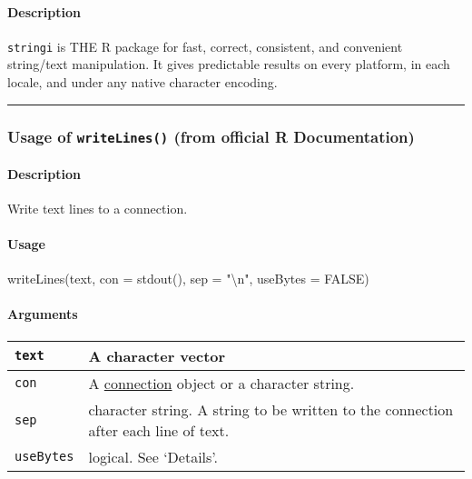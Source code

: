 \documentclass[
]{article}
\newenvironment{Shaded}{}{}
\newcommand{\NormalTok}[1]{#1}
\begin{document}
\hypertarget{description}{%
\paragraph{\texorpdfstring{\textbf{Description}}{Description}}\label{description}}

\texttt{stringi} is THE R package for fast, correct, consistent, and
convenient string/text manipulation. It gives predictable results on
every platform, in each locale, and under any native character encoding.

\begin{center}\rule{0.5\linewidth}{0.5pt}\end{center}

\hypertarget{usage-of-writelines-from-official-r-documentation}{%
\subsubsection{\texorpdfstring{Usage of \texttt{writeLines()} (from
official R
Documentation)}{Usage of writeLines() (from official R Documentation)}}\label{usage-of-writelines-from-official-r-documentation}}

\hypertarget{description-2}{%
\paragraph{Description}\label{description-2}}

Write text lines to a connection.

\hypertarget{usage}{%
\paragraph{Usage}\label{usage}}

\begin{Shaded}
\begin{Highlighting}[]
\NormalTok{writeLines(text, con = stdout(), sep = "\textbackslash{}n", useBytes = FALSE)}
\end{Highlighting}
\end{Shaded}

\hypertarget{arguments}{%
\paragraph{Arguments}\label{arguments}}

\begin{longtable}[]{@{}ll@{}}
\toprule\noalign{}
\texttt{text} & A character vector \\
\midrule\noalign{}
\endhead
\bottomrule\noalign{}
\endlastfoot
\texttt{con} & A
\href{vscode-webview://00i87qrgljff0t3jmc9gjufilst9usetvkh9gn773om0ic67o1j2/base/help/connection}{connection}
object or a character string. \\
\texttt{sep} & character string. A string to be written to the
connection after each line of text. \\
\texttt{useBytes} & logical. See `Details'. \\
\end{longtable}
\end{document}
